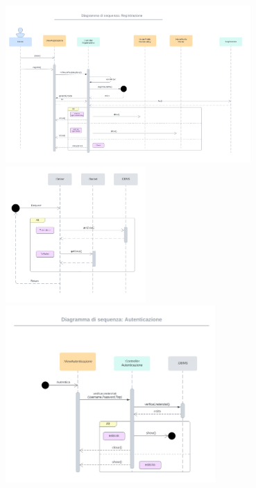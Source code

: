 \begin{center}
	\includegraphics[width=0.7\textwidth]{assets/img/sequenza_dettaglio/accesso-1.png}\\
	\includegraphics[width=0.4\textwidth]{assets/img/sequenza_dettaglio/accesso-2.png}\\
	\includegraphics[width=0.6\textwidth]{assets/img/sequenza_dettaglio/accesso-3.png}\\
\end{center}